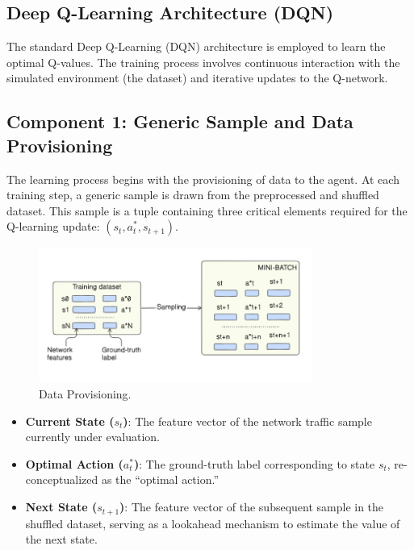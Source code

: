 \documentclass[12pt]{report}
\begin{document}
\subsection{Deep Q-Learning Architecture (DQN)}

The standard Deep Q-Learning (DQN) architecture is employed to learn the optimal Q-values. The training process involves continuous interaction with the simulated environment (the dataset) and iterative updates to the Q-network.

\subsection{Component 1: Generic Sample and Data Provisioning}

The learning process begins with the provisioning of data to the agent. At each training step, a generic sample is drawn from the preprocessed and shuffled dataset. This sample is a tuple containing three critical elements required for the Q-learning update: \( (s_t, a^*_t, s_{t+1}) \).

\begin{figure}[htbp]
    \centering
    \includegraphics[width=0.8\textwidth]{images/batching-arch.png}
    \caption{Data Provisioning.}
    \label{fig:batching-arch}
\end{figure}


\begin{itemize}
  \item \textbf{Current State (\( s_t \))}: The feature vector of the network traffic sample currently under evaluation.
  \item \textbf{Optimal Action (\( a^*_t \))}: The ground-truth label corresponding to state \( s_t \), re-conceptualized as the “optimal action.”
  \item \textbf{Next State (\( s_{t+1} \))}: The feature vector of the subsequent sample in the shuffled dataset, serving as a lookahead mechanism to estimate the value of the next state.
\end{itemize}
\end{document}
